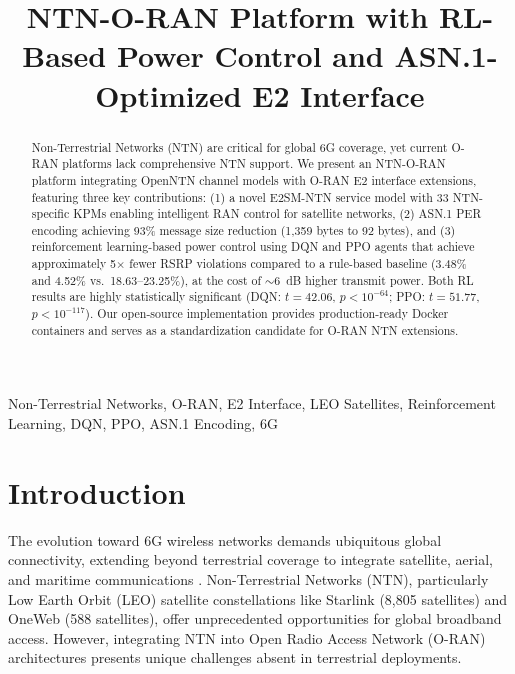 \documentclass[conference]{IEEEtran}
\begin{document}
\title{NTN-O-RAN Platform with RL-Based Power Control and ASN.1-Optimized E2 Interface\\
}

\author{
}

\maketitle

\begin{abstract}
Non-Terrestrial Networks (NTN) are critical for global 6G coverage, yet current O-RAN platforms lack comprehensive NTN support. We present an NTN-O-RAN platform integrating OpenNTN channel models with O-RAN E2 interface extensions, featuring three key contributions: (1) a novel E2SM-NTN service model with 33 NTN-specific KPMs enabling intelligent RAN control for satellite networks, (2) ASN.1 PER encoding achieving 93\% message size reduction (1,359 bytes to 92 bytes), and (3) reinforcement learning-based power control using DQN and PPO agents that achieve approximately 5$\times$ fewer RSRP violations compared to a rule-based baseline (3.48\% and 4.52\% vs.\ 18.63--23.25\%), at the cost of $\sim$6~dB higher transmit power. Both RL results are highly statistically significant (DQN: $t=42.06$, $p<10^{-64}$; PPO: $t=51.77$, $p<10^{-117}$). Our open-source implementation provides production-ready Docker containers and serves as a standardization candidate for O-RAN NTN extensions.
\end{abstract}

\begin{IEEEkeywords}
Non-Terrestrial Networks, O-RAN, E2 Interface, LEO Satellites, Reinforcement Learning, DQN, PPO, ASN.1 Encoding, 6G
\end{IEEEkeywords}

\section{Introduction}

The evolution toward 6G wireless networks demands ubiquitous global connectivity, extending beyond terrestrial coverage to integrate satellite, aerial, and maritime communications \cite{3gpp_tr38811, 3gpp_tr38821}. Non-Terrestrial Networks (NTN), particularly Low Earth Orbit (LEO) satellite constellations like Starlink (8,805 satellites) and OneWeb (588 satellites), offer unprecedented opportunities for global broadband access. However, integrating NTN into Open Radio Access Network (O-RAN) architectures presents unique challenges absent in terrestrial deployments.
\end{document}
